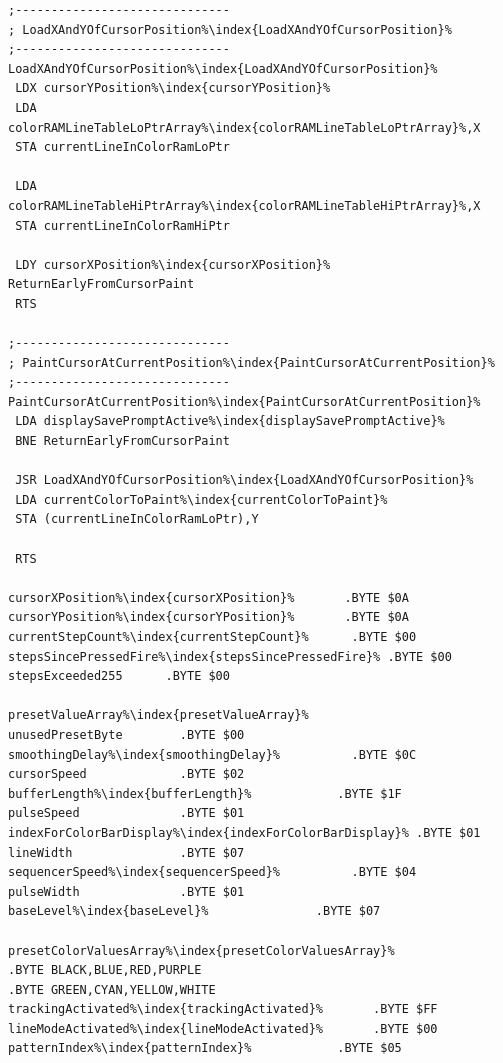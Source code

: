 \begin{minipage}[b]{0.33\linewidth}
\begin{lrbox}{\mybox}%
\begin{lstlisting}[basicstyle=\ttfamily\tiny,escapechar=\%]
;------------------------------
; LoadXAndYOfCursorPosition%\index{LoadXAndYOfCursorPosition}%
;------------------------------
LoadXAndYOfCursorPosition%\index{LoadXAndYOfCursorPosition}%
 LDX cursorYPosition%\index{cursorYPosition}%
 LDA colorRAMLineTableLoPtrArray%\index{colorRAMLineTableLoPtrArray}%,X
 STA currentLineInColorRamLoPtr

 LDA colorRAMLineTableHiPtrArray%\index{colorRAMLineTableHiPtrArray}%,X
 STA currentLineInColorRamHiPtr

 LDY cursorXPosition%\index{cursorXPosition}%
ReturnEarlyFromCursorPaint
 RTS

;------------------------------
; PaintCursorAtCurrentPosition%\index{PaintCursorAtCurrentPosition}%
;------------------------------
PaintCursorAtCurrentPosition%\index{PaintCursorAtCurrentPosition}%
 LDA displaySavePromptActive%\index{displaySavePromptActive}%
 BNE ReturnEarlyFromCursorPaint

 JSR LoadXAndYOfCursorPosition%\index{LoadXAndYOfCursorPosition}%
 LDA currentColorToPaint%\index{currentColorToPaint}%
 STA (currentLineInColorRamLoPtr),Y

 RTS

cursorXPosition%\index{cursorXPosition}%       .BYTE $0A
cursorYPosition%\index{cursorYPosition}%       .BYTE $0A
currentStepCount%\index{currentStepCount}%      .BYTE $00
stepsSincePressedFire%\index{stepsSincePressedFire}% .BYTE $00
stepsExceeded255      .BYTE $00

presetValueArray%\index{presetValueArray}%
unusedPresetByte        .BYTE $00
smoothingDelay%\index{smoothingDelay}%          .BYTE $0C
cursorSpeed             .BYTE $02
bufferLength%\index{bufferLength}%            .BYTE $1F
pulseSpeed              .BYTE $01
indexForColorBarDisplay%\index{indexForColorBarDisplay}% .BYTE $01
lineWidth               .BYTE $07
sequencerSpeed%\index{sequencerSpeed}%          .BYTE $04
pulseWidth              .BYTE $01
baseLevel%\index{baseLevel}%               .BYTE $07

presetColorValuesArray%\index{presetColorValuesArray}%
.BYTE BLACK,BLUE,RED,PURPLE
.BYTE GREEN,CYAN,YELLOW,WHITE
trackingActivated%\index{trackingActivated}%       .BYTE $FF
lineModeActivated%\index{lineModeActivated}%       .BYTE $00
patternIndex%\index{patternIndex}%            .BYTE $05


\end{lstlisting}
\end{lrbox}
\end{minipage}
